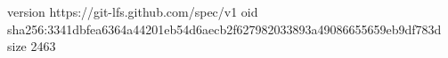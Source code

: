 version https://git-lfs.github.com/spec/v1
oid sha256:3341dbfea6364a44201eb54d6aecb2f627982033893a49086655659eb9df783d
size 2463
